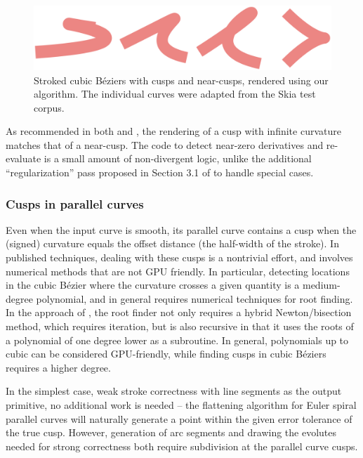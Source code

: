 \documentclass[sigconf]{acmart}
\begin{document}
\begin{figure}
    \includegraphics[scale=0.2]{tricky_strokes}
    \caption{Stroked cubic Béziers with cusps and near-cusps, rendered using our algorithm. The individual curves were adapted from the Skia test corpus.}
    \label{fig:tricky_strokes}
\end{figure}

As recommended in both \citet{Nehab2020} and \citet{Kilgard2020}, the rendering of a cusp with infinite curvature matches that of a near-cusp. The code to detect near-zero derivatives and re-evaluate is a small amount of non-divergent logic, unlike the additional ``regularization'' pass proposed in Section 3.1 of \citet{Nehab2020} to handle special cases.

\subsubsection{Cusps in parallel curves}

Even when the input curve is smooth, its parallel curve contains a cusp when the (signed) curvature equals the offset distance (the half-width of the stroke). In published techniques, dealing with these cusps is a nontrivial effort, and involves numerical methods that are not GPU friendly. In particular, detecting locations in the cubic Bézier where the curvature crosses a given quantity is a medium-degree polynomial, and in general requires numerical techniques for root finding. In the approach of \citet{Nehab2020}, the root finder not only requires a hybrid Newton/bisection method, which requires iteration, but is also recursive in that it uses the roots of a polynomial of one degree lower as a subroutine. In general, polynomials up to cubic can be considered GPU-friendly, while finding cusps in cubic Béziers requires a higher degree.

In the simplest case, weak stroke correctness with line segments as the output primitive, no additional work is needed -- the flattening algorithm for Euler spiral parallel curves will naturally generate a point within the given error tolerance of the true cusp. However, generation of arc segments and drawing the evolutes needed for strong correctness both require subdivision at the parallel curve cusps.
\end{document}
